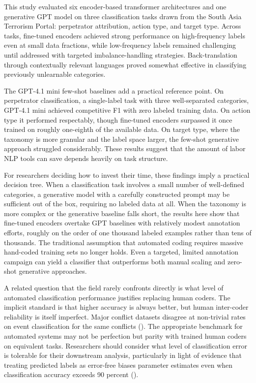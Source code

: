 \documentclass[
  11pt,
]{article}
\begin{document}
This study evaluated six encoder-based transformer architectures and one
generative GPT model on three classification tasks drawn from the South
Asia Terrorism Portal: perpetrator attribution, action type, and target
type. Across tasks, fine-tuned encoders achieved strong performance on
high-frequency labels even at small data fractions, while low-frequency
labels remained challenging until addressed with targeted
imbalance-handling strategies. Back-translation through contextually
relevant languages proved somewhat effective in classifying previously
unlearnable categories.

The GPT-4.1 mini few-shot baselines add a practical reference point. On
perpetrator classification, a single-label task with three
well-separated categories, GPT-4.1 mini achieved competitive F1 with
zero labeled training data. On action type it performed respectably,
though fine-tuned encoders surpassed it once trained on roughly
one-eighth of the available data. On target type, where the taxonomy is
more granular and the label space larger, the few-shot generative
approach struggled considerably. These results suggest that the amount
of labor NLP tools can save depends heavily on task structure.

For researchers deciding how to invest their time, these findings imply
a practical decision tree. When a classification task involves a small
number of well-defined categories, a generative model with a carefully
constructed prompt may be sufficient out of the box, requiring no
labeled data at all. When the taxonomy is more complex or the generative
baseline falls short, the results here show that fine-tuned encoders
overtake GPT baselines with relatively modest annotation efforts,
roughly on the order of one thousand labeled examples rather than tens
of thousands. The traditional assumption that automated coding requires
massive hand-coded training sets no longer holds. Even a targeted,
limited annotation campaign can yield a classifier that outperforms both
manual scaling and zero-shot generative approaches.

A related question that the field rarely confronts directly is what
level of automated classification performance justifies replacing human
coders. The implicit standard is that higher accuracy is always better,
but human inter-coder reliability is itself imperfect. Major conflict
datasets disagree at non-trivial rates on event classification for the
same conflicts (). The appropriate
benchmark for automated systems may not be perfection but parity with
trained human coders on equivalent tasks. Researchers should consider
what level of classification error is tolerable for their downstream
analysis, particularly in light of evidence that treating predicted
labels as error-free biases parameter estimates even when classification
accuracy exceeds 90 percent ().
\end{document}
